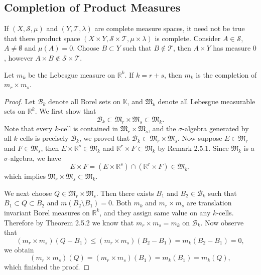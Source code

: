 \subsection{Completion of Product Measures}
If $(X,\mathscr{S},\mu)$ and $(Y,\mathscr{T},\lambda)$ are complete measure spaces, it need not be true that there product space $(X\times Y,\mathscr{S}\times\mathscr{T},\mu\times\lambda)$ is complete. Consider $A\in\mathscr{S}$, $A\ne\emptyset$ and $\mu(A)=0$. Choose $B\subset Y$ such that $B\notin\mathscr{T}$, then $A\times Y$ has measure $0$, however $A\times B\notin
\mathscr{S}\times\mathscr{T}$.\par
\begin{theorem}
Let $m_k$ be the Lebesgue measure on $\mathbb{R}^k$. If $k=r+s$, then $m_k$ is the completion of $m_r\times m_s$.
\end{theorem}
\begin{proof}
Let $\mathcal{B}_k$ denote all Borel sets on $\mathbb{K}$, and $\mathfrak{M}_k$ denote all Lebesgue measurable sets on $\mathbb{R}^k$. We first show that 
$$
\mathcal{B} _k\subset \mathfrak{M} _r\times \mathfrak{M} _s\subset \mathfrak{M} _k.
$$
Note that every $k$-cell is contained in $\mathfrak{M}_r\times\mathfrak{M}_s$, and the $\sigma$-algebra generated by all $k$-cells is precisely $\mathcal{B}_k$, we proved that $\mathcal{B}_k\subset\mathfrak{M}_r\times\mathfrak{M}_s$. Now suppose $E\in\mathfrak{M}_r$ and $F\in\mathfrak{M}_s$, then $E\times\mathbb{R}^s\in\mathfrak{M}_k$ and $\mathbb{R}^r\times F\subset\mathfrak{M}_k$ by Remark 2.5.1. Since $\mathfrak{M}_k$ is a $\sigma$-algebra, we have 
$$
E\times F=\left( E\times \mathbb{R} ^s \right) \cap \left( \mathbb{R} ^r\times F \right) \in \mathfrak{M} _k,
$$
which implies $\mathfrak{M}_r\times\mathfrak{M}_s\subset\mathfrak{M}_k$.\par
We next choose $Q\in\mathfrak{M}_r\times\mathfrak{M}_s$. Then there exists $B_1$ and $B_2\in\mathcal{B}_k$ such that $B_1\subset Q\subset B_2$ and $m(B_2\setminus B_1)=0$. Both $m_k$ and $m_r\times m_s$ are translation invariant Borel measures on $\mathbb{R}^k$, and they assign same value on any $k$-cells. Therefore by Theorem 2.5.2 we know that $m_r\times m_s=m_k$ on $\mathcal{B}_k$. Now observe that 
$$
\left( m_r\times m_s \right) \left( Q-B_1 \right) \le \left( m_r\times m_s \right) \left( B_2-B_1 \right) =m_k\left( B_2-B_1 \right) =0,
$$
we obtain 
$$
\left( m_r\times m_s \right) \left( Q \right) =\left( m_r\times m_s \right) \left( B_1 \right) =m_k\left( B_1 \right) =m_k\left( Q \right) ,
$$
which finished the proof.
\end{proof}
